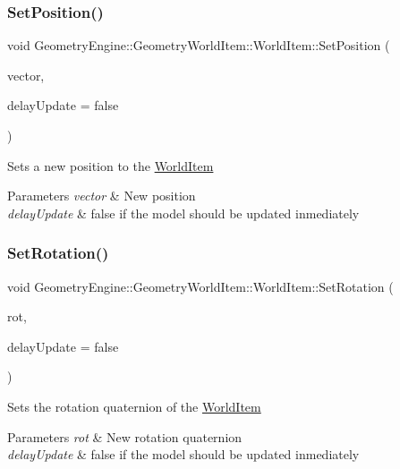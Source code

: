 \subsubsection{\texorpdfstring{SetPosition()}{SetPosition()}}
{\footnotesize\ttfamily void Geometry\+Engine\+::\+Geometry\+World\+Item\+::\+World\+Item\+::\+Set\+Position (\begin{DoxyParamCaption}\item[{const Q\+Vector3D \&}]{vector,  }\item[{bool}]{delay\+Update = {\ttfamily false} }\end{DoxyParamCaption})}

Sets a new position to the \mbox{\hyperlink{class_geometry_engine_1_1_geometry_world_item_1_1_world_item}{World\+Item}} 
\begin{DoxyParams}{Parameters}
{\em vector} & New position \\
\hline
{\em delay\+Update} & false if the model should be updated inmediately \\
\hline
\end{DoxyParams}
\mbox{\label{class_geometry_engine_1_1_geometry_world_item_1_1_world_item_ae8280e3f99ade1719aadc25b7bc999e9}} 
\subsubsection{\texorpdfstring{SetRotation()}{SetRotation()}\hspace{0.1cm}{\footnotesize\ttfamily [1/2]}}
{\footnotesize\ttfamily void Geometry\+Engine\+::\+Geometry\+World\+Item\+::\+World\+Item\+::\+Set\+Rotation (\begin{DoxyParamCaption}\item[{const Q\+Quaternion \&}]{rot,  }\item[{bool}]{delay\+Update = {\ttfamily false} }\end{DoxyParamCaption})}

Sets the rotation quaternion of the \mbox{\hyperlink{class_geometry_engine_1_1_geometry_world_item_1_1_world_item}{World\+Item}} 
\begin{DoxyParams}{Parameters}
{\em rot} & New rotation quaternion \\
\hline
{\em delay\+Update} & false if the model should be updated inmediately \\
\hline
\end{DoxyParams}
\mbox{\label{class_geometry_engine_1_1_geometry_world_item_1_1_world_item_afe2d2f6812d148817f73c12a14218941}} 
